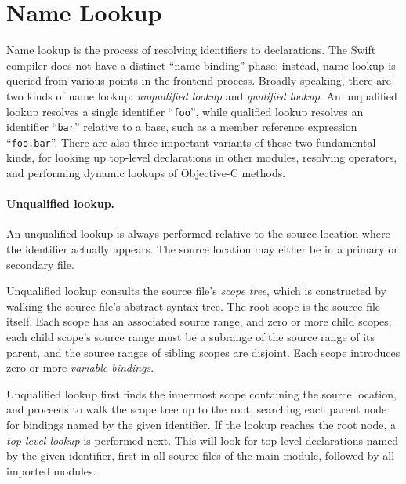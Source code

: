 \documentclass[../generics]{subfiles}
\begin{document}
\section{Name Lookup}\label{name lookup}

Name lookup is the process of resolving identifiers to declarations. The Swift compiler does not have a distinct ``name binding'' phase; instead, name lookup is queried from various points in the frontend process. Broadly speaking, there are two kinds of name lookup: \emph{unqualified lookup} and \emph{qualified lookup}. An unqualified lookup resolves a single identifier ``\texttt{foo}'', while qualified lookup resolves an identifier ``\texttt{bar}'' relative to a base, such as a member reference expression ``\texttt{foo.bar}''. There are also three important variants of these two fundamental kinds, for looking up top-level declarations in other modules, resolving operators, and performing dynamic lookups of Objective-C methods.

\paragraph{Unqualified lookup.}
An unqualified lookup is always performed relative to the source location where the identifier actually appears. The source location may either be in a primary or secondary file.

Unqualified lookup consults the source file's \emph{scope tree}, which is constructed by walking the source file's abstract syntax tree. The root scope is the source file itself. Each scope has an associated source range, and zero or more child scopes; each child scope's source range must be a subrange of the source range of its parent, and the source ranges of sibling scopes are disjoint. Each scope introduces zero or more \emph{variable bindings}.

Unqualified lookup first finds the innermost scope containing the source location, and proceeds to walk the scope tree up to the root, searching each parent node for bindings named by the given identifier. If the lookup reaches the root node, a \emph{top-level lookup} is performed next. This will look for top-level declarations named by the given identifier, first in all source files of the main module, followed by all imported modules.
\end{document}

